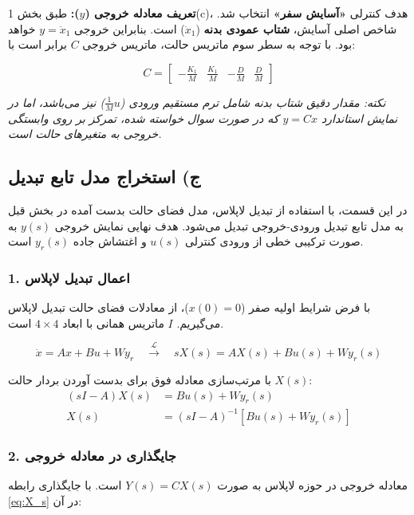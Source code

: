 \documentclass[a4paper]{article}
\begin{document}
	\textbf{تعریف معادله خروجی ($y$):}
	طبق بخش 1(c)، هدف کنترلی \textbf{«آسایش سفر»} انتخاب شد. شاخص اصلی آسایش، \textbf{شتاب عمودی بدنه} ($\ddot{x}_1$) است. بنابراین خروجی $y = \ddot{x}_1$ خواهد بود. با توجه به سطر سوم ماتریس حالت، ماتریس خروجی $C$ برابر است با:
	
	\[
	C = \begin{bmatrix} -\frac{K_1}{M} & \frac{K_1}{M} & -\frac{D}{M} & \frac{D}{M} \end{bmatrix}
	\]
	
	\emph{نکته: مقدار دقیق شتاب بدنه شامل ترم مستقیم ورودی ($\frac{1}{M}u$) نیز می‌باشد، اما در نمایش استاندارد $y=Cx$ که در صورت سوال خواسته شده، تمرکز بر روی وابستگی خروجی به متغیرهای حالت است.}
	
	
	\subsection{ج) استخراج مدل تابع تبدیل }
	در این قسمت، با استفاده از تبدیل لاپلاس، مدل فضای حالت بدست آمده در بخش قبل به مدل تابع تبدیل ورودی-خروجی تبدیل می‌شود. هدف نهایی نمایش خروجی $y(s)$ به صورت ترکیبی خطی از ورودی کنترلی $u(s)$ و اغتشاش جاده $y_r(s)$ است.
	
	\subsubsection*{1. اعمال تبدیل لاپلاس}
	با فرض شرایط اولیه صفر ($x(0)=0$)، از معادلات فضای حالت تبدیل لاپلاس می‌گیریم. $I$ ماتریس همانی  با ابعاد $4\times4$ است.
	
	\begin{equation}
		\dot{x} = Ax + Bu + Wy_r \quad \xrightarrow{\mathcal{L}} \quad sX(s) = AX(s) + Bu(s) + Wy_r(s)
	\end{equation}
	
	با مرتب‌سازی معادله فوق برای بدست آوردن بردار حالت $X(s)$:
	\begin{align}
		(sI - A)X(s) &= Bu(s) + Wy_r(s) \nonumber \\
		X(s) &= (sI - A)^{-1} \left[ Bu(s) + Wy_r(s) \right] \label{eq:X_s}
	\end{align}
	
	\subsubsection*{2. جایگذاری در معادله خروجی}
	معادله خروجی در حوزه لاپلاس به صورت $Y(s) = C X(s)$ است. با جایگذاری رابطه \eqref{eq:X_s} در آن:
	
\end{document}
